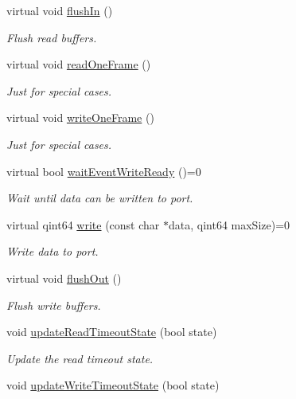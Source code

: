 \begin{DoxyCompactItemize}
virtual void \hyperlink{classmdt_abstract_port_a32329b4188db796401e4f454755acb44}{flushIn} ()
\begin{DoxyCompactList}\small\item\em Flush read buffers. \end{DoxyCompactList}\item 
virtual void \hyperlink{classmdt_abstract_port_ab1738b5b6b78743ee2d36ccf5daa7c00}{readOneFrame} ()
\begin{DoxyCompactList}\small\item\em Just for special cases. \end{DoxyCompactList}\item 
virtual void \hyperlink{classmdt_abstract_port_a2235d62d9a9e4555d41773c41cc3bc70}{writeOneFrame} ()
\begin{DoxyCompactList}\small\item\em Just for special cases. \end{DoxyCompactList}\item 
virtual bool \hyperlink{classmdt_abstract_port_a7773bc21c63ce6a275f5a0889935ac83}{waitEventWriteReady} ()=0
\begin{DoxyCompactList}\small\item\em Wait until data can be written to port. \end{DoxyCompactList}\item 
virtual qint64 \hyperlink{classmdt_abstract_port_a64d4802975a76474b9196c91f57a6d90}{write} (const char $\ast$data, qint64 maxSize)=0
\begin{DoxyCompactList}\small\item\em Write data to port. \end{DoxyCompactList}\item 
virtual void \hyperlink{classmdt_abstract_port_ad199c6310801893f1f7de2a2391606fc}{flushOut} ()
\begin{DoxyCompactList}\small\item\em Flush write buffers. \end{DoxyCompactList}\item 
void \hyperlink{classmdt_abstract_port_a0fc7317e988d5dea53a999cd1bf4faa9}{updateReadTimeoutState} (bool state)
\begin{DoxyCompactList}\small\item\em Update the read timeout state. \end{DoxyCompactList}\item 
void \hyperlink{classmdt_abstract_port_ab51135de1f7bbc4707c3284f924c98dc}{updateWriteTimeoutState} (bool state)

\end{DoxyCompactItemize}
